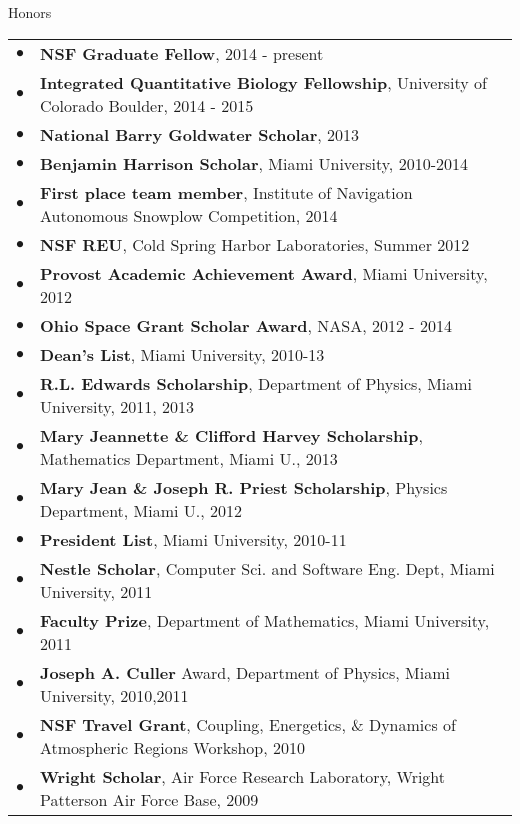 \documentclass{resume} %
\begin{document}
\begin{rSection}{Honors}
  \begin{tabular}{ll}
    $\bullet$ & \textbf{NSF Graduate Fellow}, 2014 - present\\
    $\bullet$ & \textbf{Integrated Quantitative Biology Fellowship}, University of Colorado Boulder, 2014 - 2015\\
    $\bullet$ & \textbf{National Barry Goldwater Scholar}, 2013\\
    $\bullet$ & \textbf{Benjamin Harrison Scholar}, Miami University, 2010-2014\\
    $\bullet$ & \textbf{First place team member}, Institute of Navigation Autonomous Snowplow Competition, 2014\\
    $\bullet$ & \textbf{NSF REU}, Cold Spring Harbor Laboratories, Summer 2012\\
    $\bullet$ & \textbf{Provost Academic Achievement Award}, Miami University, 2012\\
    $\bullet$ & \textbf{Ohio Space Grant Scholar Award}, NASA, 2012 - 2014\\
    $\bullet$ & \textbf{Dean's List}, Miami University, 2010-13\\
    $\bullet$ & \textbf{R.L. Edwards Scholarship}, Department of Physics, Miami University, 2011, 2013\\
    $\bullet$ & \textbf{Mary Jeannette \& Clifford Harvey Scholarship}, Mathematics Department, Miami U., 2013\\
    $\bullet$ & \textbf{Mary Jean \& Joseph R. Priest Scholarship}, Physics Department, Miami U., 2012\\
    $\bullet$ & \textbf{President List}, Miami University, 2010-11\\
    $\bullet$ & \textbf{Nestle Scholar}, Computer Sci. and Software Eng. Dept, Miami University, 2011\\
    $\bullet$ & \textbf{Faculty Prize}, Department of Mathematics, Miami University, 2011\\
    $\bullet$ & \textbf{Joseph A. Culler} Award, Department of Physics, Miami University, 2010,2011\\
    $\bullet$ & \textbf{NSF Travel Grant}, Coupling, Energetics, \& Dynamics of Atmospheric Regions Workshop, 2010\\
    $\bullet$ & \textbf{Wright Scholar}, Air Force Research Laboratory, Wright Patterson Air Force Base, 2009\\
  \end{tabular}
\end{rSection}
\end{document}

